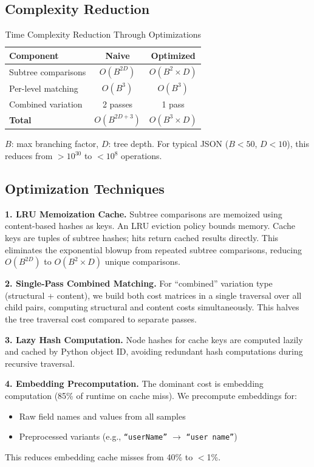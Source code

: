 \documentclass{article}
\theoremstyle{plain}
\theoremstyle{definition}
\begin{document}
\subsection{Complexity Reduction}

\begin{table}[h]
\centering
\caption{Time Complexity Reduction Through Optimizations}
\label{tab:complexity-reduction}
\scriptsize
\begin{tabular}{@{}lcc@{}}
\toprule
\textbf{Component} & \textbf{Naive} & \textbf{Optimized} \\
\midrule
Subtree comparisons & $O(B^{2D})$ & $O(B^2 \times D)$ \\
Per-level matching & $O(B^3)$ & $O(B^3)$ \\
Combined variation & 2 passes & 1 pass \\
\midrule
\textbf{Total} & $O(B^{2D+3})$ & $O(B^3 \times D)$ \\
\bottomrule
\end{tabular}

\vspace{0.3em}
\raggedright\small $B$: max branching factor, $D$: tree depth. For typical JSON ($B<50$, $D<10$), this reduces from $>10^{30}$ to $<10^{8}$ operations.
\end{table}

\subsection{Optimization Techniques}

\textbf{1. LRU Memoization Cache.} Subtree comparisons are memoized using content-based hashes as keys. An LRU eviction policy bounds memory. Cache keys are tuples of subtree hashes; hits return cached results directly. This eliminates the exponential blowup from repeated subtree comparisons, reducing $O(B^{2D})$ to $O(B^2 \times D)$ unique comparisons.

\textbf{2. Single-Pass Combined Matching.} For ``combined'' variation type (structural + content), we build both cost matrices in a single traversal over all child pairs, computing structural and content costs simultaneously. This halves the tree traversal cost compared to separate passes.

\textbf{3. Lazy Hash Computation.} Node hashes for cache keys are computed lazily and cached by Python object ID, avoiding redundant hash computations during recursive traversal.

\textbf{4. Embedding Precomputation.} The dominant cost is embedding computation (85\% of runtime on cache miss). We precompute embeddings for:
\begin{itemize}
\item Raw field names and values from all samples
\item Preprocessed variants (e.g., \texttt{``userName''} $\rightarrow$ \texttt{``user name''})
\end{itemize}
This reduces embedding cache misses from 40\% to $<$1\%.
\end{document}

